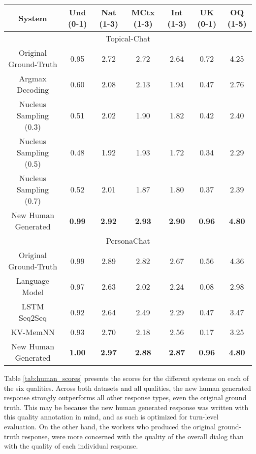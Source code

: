 \documentclass[11pt,a4paper]{article}
\begin{document}
\begin{table*}
    \centering
    \begin{tabular}{|c|c|c|c|c|c|c|}
    \hline
    \textbf{System} & \textbf{Und} (0-1) & \textbf{Nat} (1-3) & \textbf{MCtx} (1-3) & \textbf{Int} (1-3) & \textbf{UK} (0-1) & \textbf{OQ} (1-5) \\ \hline
    
    \multicolumn{7}{|c|}{Topical-Chat} \\ \hline
    Original Ground-Truth    &  0.95  & 2.72 & 2.72 & 2.64 & 0.72 & 4.25 \\ 
    Argmax Decoding &  0.60  & 2.08 & 2.13 & 1.94 & 0.47 & 2.76 \\
    Nucleus Sampling (0.3) & 0.51 & 2.02 & 1.90 & 1.82 & 0.42 & 2.40 \\
    Nucleus Sampling (0.5) & 0.48 & 1.92 & 1.93 & 1.72 & 0.34 & 2.29 \\
    Nucleus Sampling (0.7) & 0.52 & 2.01 & 1.87 & 1.80 & 0.37 & 2.39 \\
    New Human Generated & \textbf{0.99} & \textbf{2.92} & \textbf{2.93} & \textbf{2.90} & \textbf{0.96} & \textbf{4.80} \\ \hline    \multicolumn{7}{|c|}{PersonaChat} \\ \hline
    Original Ground-Truth    &  0.99 & 2.89 & 2.82 & 2.67 & 0.56 & 4.36 \\ 
    Language Model & 0.97 & 2.63 & 2.02 & 2.24 & 0.08 & 2.98 \\
    LSTM Seq2Seq & 0.92 & 2.64 & 2.49 & 2.29 & 0.47 & 3.47 \\
    KV-MemNN &  0.93  & 2.70 & 2.18 & 2.56 & 0.17 & 3.25 \\
    New Human Generated & \textbf{1.00} & \textbf{2.97} & \textbf{2.88} & \textbf{2.87} & \textbf{0.96} & \textbf{4.80} \\ \hline   

    \end{tabular}
    \caption{Average scores for the six different responses, on the six quality: Understandable, Natural, Maintains Context, Interesting, Uses Knowledge and Overall Quality.}
    \label{tab:human_scores}
\end{table*}

Table \ref{tab:human_scores} presents the scores for the different systems on each of the six qualities. Across both datasets and all qualities, the new human generated response strongly outperforms all other response types, even the original ground truth. This may be because the new human generated response was written with this quality annotation in mind, and as such is optimized for turn-level evaluation. On the other hand, the workers who produced the original ground-truth response, were more concerned with the quality of the overall dialog than with the quality of each individual response. 
\end{document}
